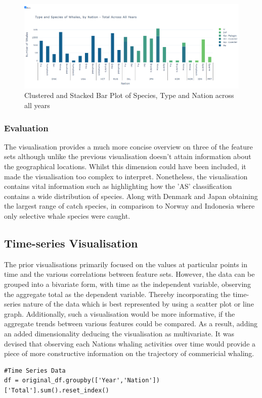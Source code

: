 \documentclass[12pt,a4paper]{article}
\begin{document}
\begin{figure}[H]
    \centering
    \includegraphics[width = 15cm]{CategoricalALL.png}
    \caption{Clustered and Stacked Bar Plot of Species, Type and Nation across all years}
    \label{fig:my_label}
\end{figure}


\subsubsection{Evaluation}
The visualisation provides a much more concise overview on three of the feature sets although unlike the previous visualisation doesn't attain information about the geographical locations. Whilst this dimension could have been included, it made the visualisation too complex to interpret. Nonetheless, the visualisation contains vital information such as highlighting how the 'AS' classification contains a wide distribution of species. Along with Denmark and Japan obtaining the largest range of catch species, in comparison to Norway and Indonesia where only selective whale species were caught. 



\subsection{Time-series Visualisation}
The prior visualisations primarily focused on the values at particular points in time and the various correlations between feature sets. However, the data can be grouped into a bivariate form, with time as the independent variable, observing the aggregate total as the dependent variable. Thereby incorporating the time-series nature of the data which is best represented by using a scatter plot or line graph. 
Additionally, such a visualisation would be more informative, if the aggregate trends between various features could be compared. As a result, adding an added dimensionality deducing the visualisation as multivariate. It was devised that observing each Nations whaling activities over time would provide a piece of more constructive information on the trajectory of commericial whaling. 
\begin{verbatim}
#Time Series Data
df = original_df.groupby(['Year','Nation'])
['Total'].sum().reset_index()
\end{verbatim}
\end{document}
